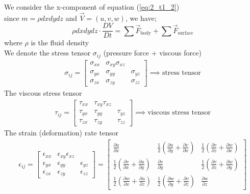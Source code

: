 \documentclass[11pt]{report}
\newcommand{\sps}{\\[0.2cm]}
\newcommand{\refn}[1]{(\ref{#1})}
\newcommand{\refx}[1]{\refn{eq:#1}}
\newcommand{\NI}{\noindent}
\begin{document}
	\NI We consider the x-component of equation \refx{2_t1_2}\\
	since $m=\rho dx dy dz$ and $\vec{V} = (u,v,w)$, we have;
	\begin{equation}
		\rho dx dy dz \cdot \frac{DV}{Dt} = \sum \vec{F}_{\text{body}} + \sum \vec{F}_{\text{surface}}\tag{3}\label{eq:2_t1_3}
	\end{equation}
	where $\rho$ is the fluid density\\
	We denote the stress tensor $\sigma_{ij}$ (pressure force + viscous force)
	\begin{eqnarray*}
		\sigma_{ij} = \begin{bmatrix}
			\sigma_{xx} & \sigma_{xy} \sigma_{xz}\sps
			\sigma_{yx} & \sigma_{yy} & \sigma_{yz}\sps
			\sigma_{zx} & \sigma_{zy} & \sigma_{zz}
		\end{bmatrix} \implies \text{stress tensor}
	\end{eqnarray*}
	The viscous stress tensor
	\begin{eqnarray*}
		\tau_{ij} = \begin{bmatrix}
			\tau_{xx} & \tau_{xy} \tau_{xz}\sps
			\tau_{yx} & \tau_{yy} & \tau_{yz}\sps
			\tau_{zx} & \tau_{zy} & \tau_{zz}
		\end{bmatrix} \implies \text{viscous stress tensor}
	\end{eqnarray*}
	The strain (deformation) rate tensor
	\begin{eqnarray*}
		\epsilon_{ij} = \begin{bmatrix}
			\epsilon_{xx} & \epsilon_{xy} \epsilon_{xz}\sps
			\epsilon_{yx} & \epsilon_{yy} & \epsilon_{yz}\sps
			\epsilon_{zx} & \epsilon_{zy} & \epsilon_{zz}
		\end{bmatrix} = 
						\begin{bmatrix}
							\frac{\partial u}{\partial x} & \frac{1}{2}\left(\frac{\partial u}{\partial y} + \frac{\partial v}{\partial x}\right) & \frac{1}{2}\left(\frac{\partial v}{\partial z}+ \frac{\partial w}{\partial x}\right)\sps
							\frac{1}{2}\left(\frac{\partial v}{\partial x}+ \frac{\partial u}{\partial y}\right) & \frac{\partial v}{\partial y} & \frac{1}{2}\left(\frac{\partial v}{\partial z}+ \frac{\partial w}{\partial y}\right)\sps
							\frac{1}{2}\left(\frac{\partial w}{\partial x}+ \frac{\partial u}{\partial z}\right) & \frac{1}{2}\left(\frac{\partial w}{\partial y}+ \frac{\partial v}{\partial z}\right) & \frac{\partial w}{\partial z}
						\end{bmatrix}
	\end{eqnarray*}
	
\end{document}

